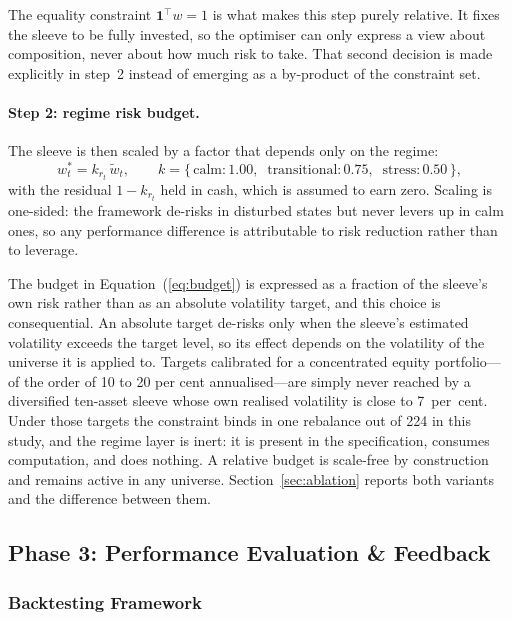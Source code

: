 \documentclass{singlecol-new}
\theoremstyle{TH}{
\newtheorem{lemma}{Lemma}
\newtheorem{theorem}[lemma]{Theorem}
\newtheorem{corrolary}[lemma]{Corrolary}
\newtheorem{conjecture}[lemma]{Conjecture}
\newtheorem{proposition}[lemma]{Proposition}
\newtheorem{claim}[lemma]{Claim}
\newtheorem{stheorem}[lemma]{Wrong Theorem}
\newtheorem{algorithm}{Algorithm}
}
\theoremstyle{THrm}{
\newtheorem{definition}{Definition}[section]
\newtheorem{question}{Question}[section]
\newtheorem{remark}{Remark}
\newtheorem{scheme}{Scheme}
}
\theoremstyle{THhit}{
\newtheorem{case}{Case}[section]
}
\begin{document}
The equality constraint $\mathbf{1}^{\top} w = 1$ is what makes this step purely relative.
It fixes the sleeve to be fully invested, so the optimiser can only express a view about
composition, never about how much risk to take. That second decision is made explicitly
in step~2 instead of emerging as a by-product of the constraint set.

\paragraph{Step 2: regime risk budget.} The sleeve is then scaled by a factor that depends
only on the regime:
\begin{equation}
w^{\ast}_t = k_{r_t} \, \tilde{w}_t, \qquad
k = \{\,\text{calm}: 1.00, \;\; \text{transitional}: 0.75, \;\; \text{stress}: 0.50\,\},
\label{eq:budget}
\end{equation}
with the residual $1 - k_{r_t}$ held in cash, which is assumed to earn zero. Scaling is
one-sided: the framework de-risks in disturbed states but never levers up in calm ones,
so any performance difference is attributable to risk reduction rather than to leverage.

The budget in Equation~(\ref{eq:budget}) is expressed as a fraction of the sleeve's own
risk rather than as an absolute volatility target, and this choice is consequential. An
absolute target de-risks only when the sleeve's estimated volatility exceeds the target
level, so its effect depends on the volatility of the universe it is applied to. Targets
calibrated for a concentrated equity portfolio---of the order of 10 to 20 per cent
annualised---are simply never reached by a diversified ten-asset sleeve whose own realised
volatility is close to 7~per~cent. Under those targets the constraint binds in one
rebalance out of 224 in this study, and the regime layer is inert: it is present in the
specification, consumes computation, and does nothing. A relative budget is scale-free by
construction and remains active in any universe. Section~\ref{sec:ablation} reports both
variants and the difference between them.

\subsection{Phase 3: Performance Evaluation \& Feedback}

\subsubsection{Backtesting Framework}
\end{document}
